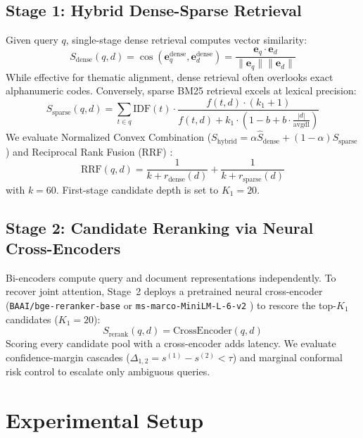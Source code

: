 \subsection{Stage 1: Hybrid Dense-Sparse Retrieval}
Given query $q$, single-stage dense retrieval computes vector similarity:
\begin{equation}
    S_{\text{dense}}(q, d) = \cos(\mathbf{e}_q^{\text{dense}}, \mathbf{e}_d^{\text{dense}}) = \frac{\mathbf{e}_q \cdot \mathbf{e}_d}{\|\mathbf{e}_q\| \|\mathbf{e}_d\|}
\end{equation}
While effective for thematic alignment, dense retrieval often overlooks exact alphanumeric codes. Conversely, sparse BM25 retrieval excels at lexical precision:
\begin{equation}
    S_{\text{sparse}}(q, d) = \sum_{t \in q} \mathrm{IDF}(t) \cdot \frac{f(t, d) \cdot (k_1 + 1)}{f(t, d) + k_1 \cdot \left(1 - b + b \cdot \frac{|d|}{\mathrm{avgdl}}\right)}
\end{equation}
We evaluate Normalized Convex Combination ($S_{\text{hybrid}} = \alpha \hat{S}_{\text{dense}} + (1-\alpha) \hat{S}_{\text{sparse}}$) and Reciprocal Rank Fusion (RRF) \cite{cormack2009rrf}:
\begin{equation}
    \text{RRF}(q, d) = \frac{1}{k + r_{\text{dense}}(d)} + \frac{1}{k + r_{\text{sparse}}(d)}
    \label{eq:rrf}
\end{equation}
with $k=60$. First-stage candidate depth is set to $K_1 = 20$.

\subsection{Stage 2: Candidate Reranking via Neural Cross-Encoders}
Bi-encoders compute query and document representations independently. To recover joint attention, Stage~2 deploys a pretrained neural cross-encoder (\texttt{BAAI/bge-reranker-base} \cite{xiao2023bge} or \texttt{ms-marco-MiniLM-L-6-v2} \cite{nogueira2019passage, reimers2019sbert}) to rescore the top-$K_1$ candidates ($K_1 = 20$):
\begin{equation}
    S_{\text{rerank}}(q, d) = \text{CrossEncoder}(q, d)
\end{equation}
Scoring every candidate pool with a cross-encoder adds latency. We evaluate confidence-margin cascades ($\Delta_{1,2} = s^{(1)} - s^{(2)} < \tau$) and marginal conformal risk control to escalate only ambiguous queries.

\section{Experimental Setup}
\label{sec:experimental_setup}

